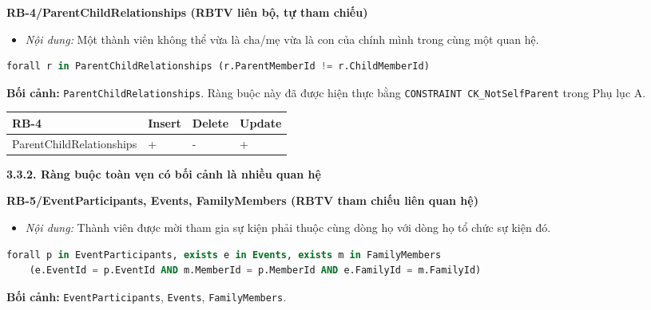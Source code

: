 \vspace{1.0em}
\textbf{RB-4/ParentChildRelationships (RBTV liên bộ, tự tham chiếu)}
\begin{itemize}
	\item \emph{Nội dung:} Một thành viên không thể vừa là cha/mẹ vừa là con của chính mình trong cùng một quan hệ.
\end{itemize}

\begin{lstlisting}[language=SQL]
	forall r in ParentChildRelationships (r.ParentMemberId != r.ChildMemberId)
\end{lstlisting}
\noindent\textbf{Bối cảnh:} \texttt{ParentChildRelationships}. Ràng buộc này đã được hiện thực bằng \texttt{CONSTRAINT CK\_NotSelfParent} trong Phụ lục A.

\vspace{0.4em}
{\centering
	\renewcommand{\arraystretch}{1.2}
	\begin{tabular}{|>{\raggedright\arraybackslash}p{}|>{\centering\arraybackslash}p{}|>{\centering\arraybackslash}p{}|>{\centering\arraybackslash}p{}|}
		\hline
		\textbf{RB-4} & \textbf{Insert} & \textbf{Delete} & \textbf{Update} \\ \hline
		ParentChildRelationships & + & - & + \\ \hline
	\end{tabular}\par}

\vspace{1.4em}
{}
{\large\bfseries 3.3.2. Ràng buộc toàn vẹn có bối cảnh là nhiều quan hệ}\par\vspace{0.6em}

\textbf{RB-5/EventParticipants, Events, FamilyMembers (RBTV tham chiếu liên quan hệ)}
\begin{itemize}
	\item \emph{Nội dung:} Thành viên được mời tham gia sự kiện phải thuộc cùng dòng họ với dòng họ tổ chức sự kiện đó.
\end{itemize}

\begin{lstlisting}[language=SQL]
	forall p in EventParticipants, exists e in Events, exists m in FamilyMembers
	(e.EventId = p.EventId AND m.MemberId = p.MemberId AND e.FamilyId = m.FamilyId)
\end{lstlisting}
\noindent\textbf{Bối cảnh:} \texttt{EventParticipants}, \texttt{Events}, \texttt{FamilyMembers}.

